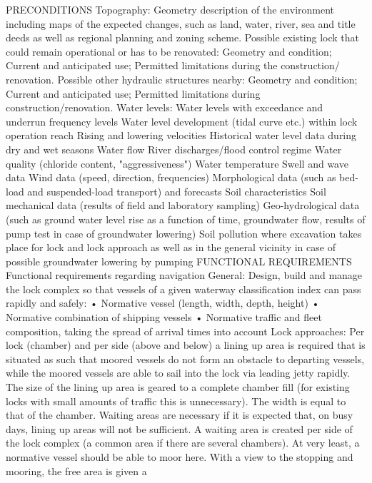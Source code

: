 PRECONDITIONS
Topography:
Geometry description of the environment including maps of the
expected changes, such as land, water, river, sea and title deeds as
well as regional planning and zoning scheme.
Possible existing lock that could remain operational or has to be
renovated:
Geometry and condition;
Current and anticipated use;
Permitted limitations during the construction/ renovation.
Possible other hydraulic structures nearby:
Geometry and condition;
Current and anticipated use;
Permitted limitations during construction/renovation.
Water levels:
Water levels with exceedance and underrun frequency levels
Water level development (tidal curve etc.) within lock operation
reach
Rising and lowering velocities
Historical water level data during dry and wet seasons
Water flow
River discharges/flood control regime
Water quality (chloride content, "aggressiveness")
Water temperature
Swell and wave data
Wind data (speed, direction, frequencies)
Morphological data (such as bed-load and suspended-load
transport) and forecasts
Soil characteristics
Soil mechanical data (results of field and laboratory sampling)
Geo-hydrological data (such as ground water level rise as a function
of time, groundwater flow, results of pump test in case of groundwater
lowering)
Soil pollution where excavation takes place for lock and lock approach
as well as in the general vicinity in case of possible groundwater
lowering by pumping
FUNCTIONAL REQUIREMENTS
Functional requirements regarding navigation
General:
Design, build and manage the lock complex so that vessels of a
given waterway classification index can pass rapidly and safely:
• Normative vessel (length, width, depth, height)
• Normative combination of shipping vessels
• Normative traffic and fleet composition, taking the spread of
arrival times into account
Lock approaches:
Per lock (chamber) and per side (above and below) a lining up area
is required that is situated as such that moored vessels do not form
an obstacle to departing vessels, while the moored vessels are able
to sail into the lock via leading jetty rapidly.
The size of the lining up area is geared to a complete chamber fill
(for existing locks with small amounts of traffic this is unnecessary).
The width is equal to that of the chamber.
Waiting areas are necessary if it is expected that, on busy days,
lining up areas will not be sufficient. A waiting area is created per
side of the lock complex (a common area if there are several chambers).
At very least, a normative vessel should be able to moor here.
With a view to the stopping and mooring, the free area is given a
